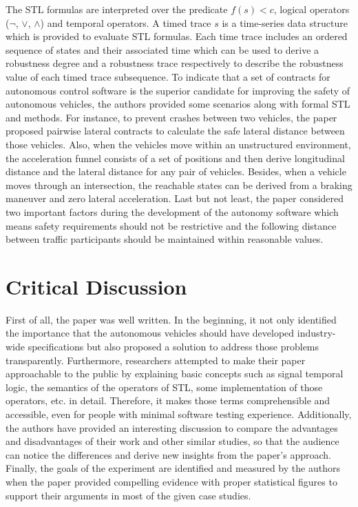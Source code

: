\documentclass[10pt,a4paper]{report}
\begin{document}
The STL formulas are interpreted over the predicate $f(s) < c$, logical operators ($\neg$, $\lor$, $\land$) and temporal operators.
%
A timed trace $s$ is a time-series data structure which is provided to evaluate STL formulas.
%
Each time trace includes an ordered sequence of states and their associated time which can be used to derive a robustness degree and a robustness trace respectively to describe the robustness value of each timed trace subsequence.
%
To indicate that a set of contracts for autonomous control software is the superior candidate for improving the safety of autonomous vehicles, the authors provided some scenarios along with formal STL and methods.
%
For instance, to prevent crashes between two vehicles, the paper proposed pairwise lateral contracts to calculate the safe lateral distance between those vehicles.
%
Also, when the vehicles move within an unstructured environment, the acceleration funnel consists of a set of positions and then derive longitudinal distance and the lateral distance for any pair of vehicles.
%
Besides, when a vehicle moves through an intersection, the reachable states can be derived from a braking maneuver and zero lateral acceleration.
%
Last but not least, the paper considered two important factors during the development of the autonomy software which means safety requirements should not be restrictive and the following distance between traffic participants should be maintained within reasonable values.

\section{Critical Discussion}
First of all, the paper was well written. In the beginning, it not only identified the importance that the autonomous vehicles should have developed industry-wide speciﬁcations but also proposed a solution to address those problems transparently.
%
Furthermore, researchers attempted to make their paper approachable to the public by explaining basic concepts such as signal temporal logic, the semantics of the operators of STL, some implementation of those operators, etc. in detail. 
%
Therefore, it makes those terms comprehensible and accessible, even for people with minimal software testing experience.
%
Additionally, the authors have provided an interesting discussion to compare the advantages and disadvantages of their work and other similar studies, so that the audience can notice the differences and derive new insights from the paper's approach.
%
Finally, the goals of the experiment are identified and measured by the authors when the paper provided compelling evidence with proper statistical figures to support their arguments in most of the given case studies.
%
\end{document}
